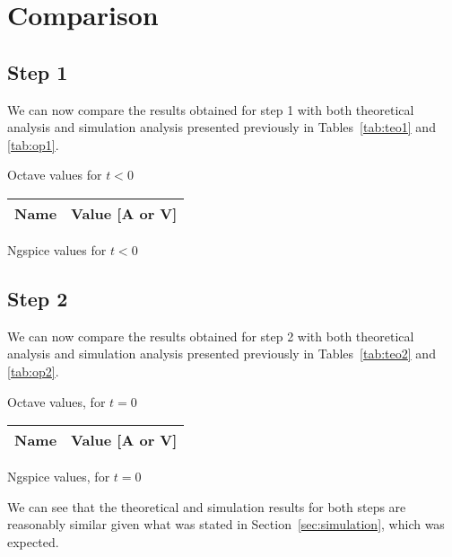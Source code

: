 
\clearpage
\section{Comparison}
\label{sec:comparison}

\subsection{Step 1}

We can now compare the results obtained for step 1 with both theoretical analysis and simulation analysis presented previously in Tables~\ref{tab:teo1} and \ref{tab:op1}.\\

\begin{minipage}[b]{0.48\textwidth}
\centering
    
    \captionsetup{type=table}
\caption{Octave values for $t<0$}
\label{tab:Octave1}
\end{minipage}
\begin{minipage}[b]{0.48\textwidth}
\centering
 \begin{tabular}{|l|r|}
    \hline
     {\bf Name} & {\bf Value [A or V]} \\ \hline
   
    \end{tabular}
    \captionsetup{type=table}
  \caption{Ngspice values for $t<0$}
  \label{tab:ngspice1}
\end{minipage}


\clearpage
\subsection{Step 2}
We can now compare the results obtained for step 2 with both theoretical analysis and simulation analysis presented previously in Tables~\ref{tab:teo2} and \ref{tab:op2}.\\

\begin{minipage}[b]{0.48\textwidth}
\centering
    
    \captionsetup{type=table}
\caption{Octave values, for $t=0$}
\label{tab:Octave2}
\end{minipage}
\begin{minipage}[b]{0.48\textwidth}
\centering
 \begin{tabular}{|l|r|}
    \hline
     {\bf Name} & {\bf Value [A or V]} \\ \hline
    
  \end{tabular}
    \captionsetup{type=table}
  \caption{Ngspice values, for $t=0$}
  \label{tab:ngspice2}
\end{minipage}

We can see that the theoretical and simulation results for both steps are  reasonably similar given what was stated in Section~\ref{sec:simulation}, which was expected.















